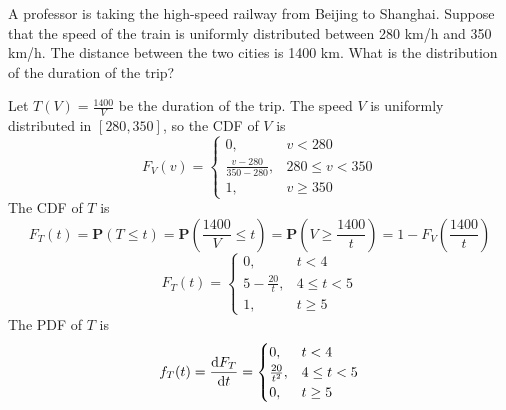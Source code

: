 \documentclass[device=normal, lang=en]{elegantbook}
\numberwithin{equation}{section}
\begin{document}
\begin{example}
    A professor is taking the high-speed railway from Beijing to Shanghai. Suppose that the speed of the train is uniformly distributed between 280 km/h and 350 km/h. The distance between the two cities is 1400 km. What is the distribution of the duration of the trip?
\end{example}
\begin{solution}
    Let $T(V) = \frac{1400}{V}$ be the duration of the trip. The speed $V$ is uniformly distributed in $[280, 350]$, so the CDF of $V$ is
    \begin{equation}
        F_{V}(v) = \begin{cases}
            0, & v < 280 \\ 
            \frac{v - 280}{350 - 280}, & 280 \leq v < 350 \\ 
            1, & v \geq 350
        \end{cases}
    \end{equation}
    The CDF of $T$ is
    \begin{equation}
        F_{T}(t) = \mathbf{P}(T \leq t) = \mathbf{P}\left(\frac{1400}{V} \leq t\right) = \mathbf{P}\left(V \geq \frac{1400}{t}\right) = 1 - F_{V}\left(\frac{1400}{t}\right)
    \end{equation}
    \begin{equation}
        F_{T}(t) = \begin{cases}
            0, & t < 4 \\ 
            5 - \frac{20}{t}, & 4 \leq t < 5 \\ 
            1, & t \geq 5
        \end{cases}
    \end{equation}
    The PDF of $T$ is
    \begin{equation}
        f_{T}(t) = \dv{F_{T}}{t} = \begin{cases}
            0, & t < 4 \\ 
            \frac{20}{t^2}, & 4 \leq t < 5 \\ 
            0, & t \geq 5
        \end{cases}
    \end{equation}
\end{solution}
\end{document}
